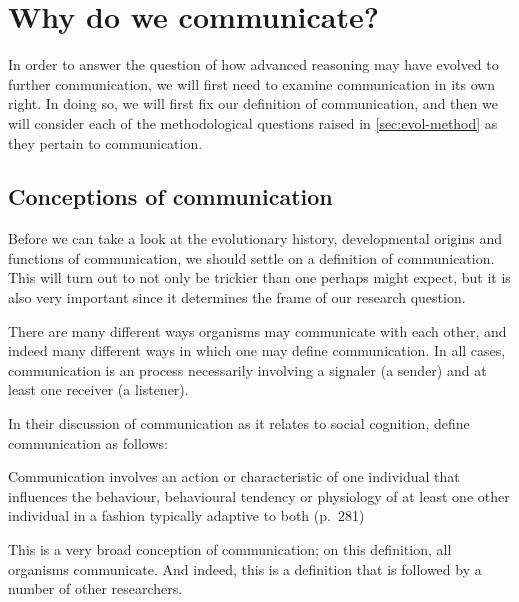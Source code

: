 \chapter{Why do we communicate?}
\label{ch:communication}

In order to answer the question of how advanced reasoning may have evolved to further communication, we will first need to examine communication in its own right. In doing so, we will first fix our definition of communication, and then we will consider each of the methodological questions raised in \cref{sec:evol-method} as they pertain to communication.

\section{Conceptions of communication}
\label{sec:comm:definition}

Before we can take a look at the evolutionary history, developmental origins and functions of communication, we should settle on a definition of communication. This will turn out to not only be trickier than one perhaps might expect, but it is also very important since it determines the frame of our research question.

There are many different ways organisms may communicate with each other, and indeed many different ways in which one may define communication. In all cases, communication is an process necessarily involving a signaler (a sender) and at least one receiver (a listener).

In their discussion of communication as it relates to social cognition, \citet{Freeberg19} define communication as follows:
\begin{quoting}
    Communication involves an action or characteristic of one individual that influences the behaviour, behavioural tendency or physiology of at least one other individual in a fashion typically adaptive to both
    \hfill (p.~281)
\end{quoting}
This is a very broad conception of communication; on this definition, all organisms communicate. And indeed, this is a definition that is followed by a number of other researchers.

